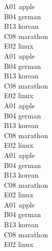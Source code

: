 \large
\begin{center}
\begin{tcolorbox}[colback=white, colframe=myBlue,title={$\vcenter{\hbox{\texttt{[image: plus.png]}}}$ \textcolor{white}{\bfseries These items are good choices.}}]
\begin{multicols}{4}    %
 A01 apple\\B04 german\\B13 korean\\C08 marathon\\E02 linux\\
 A01 apple\\B04 german\\B13 korean\\C08 marathon\\E02 linux\\
 A01 apple\\B04 german\\B13 korean\\C08 marathon\\E02 linux\\
 A01 apple\\B04 german\\B13 korean\\C08 marathon\\E02 linux\\
 A01 apple\\B04 german\\B13 korean\\C08 marathon\\E02 linux\\
\end{multicols}
\end{tcolorbox}


\end{center}
